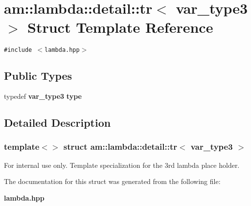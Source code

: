 \section{am::lambda::detail::tr$<$ var\_\-type3 $>$ Struct Template Reference}
\label{structam_1_1lambda_1_1detail_1_1tr_3_01var__type3_01_4}
{\tt \#include $<$lambda.hpp$>$}

\subsection*{Public Types}
\begin{CompactItemize}
\item 
typedef {\bf var\_\-type3} \textbf{type}\label{structam_1_1lambda_1_1detail_1_1tr_3_01var__type3_01_4_f69f2d9151de08941730cd0252ba93eb}

\end{CompactItemize}


\subsection{Detailed Description}
\subsubsection*{template$<$$>$ struct am::lambda::detail::tr$<$ var\_\-type3 $>$}

\begin{Desc}
\item[For internal use only.]
Template specialization for the 3rd lambda place holder. \end{Desc}




The documentation for this struct was generated from the following file:\begin{CompactItemize}
\item 
{\bf lambda.hpp}\end{CompactItemize}

